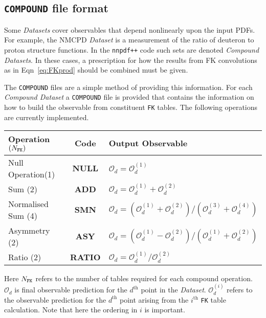 \documentclass[11pt]{article}
\begin{document}
\subsection{{\tt COMPOUND} file format}
Some \emph{Datasets} cover observables that depend nonlinearly upon the input PDFs. For example, the NMCPD \emph{Dataset} is a measurement of the ratio of deuteron to proton structure functions. In the {\tt nnpdf++} code such sets are denoted \emph{Compound Datasets}. In these cases, a prescription for how the results from FK convolutions as in Eqn~\ref{eq:FKprod} should be combined must be given. 

The {\tt COMPOUND} files are a simple method of providing this information. For each \emph{Compound Dataset} a {\tt COMPOUND} file is provided that contains the information on how to build the observable from constituent {\tt FK} tables. The following operations are currently implemented.
\begin{table}[htp]
\begin{center}
\begin{tabular}{|l|c|l|}
\hline
Operation $(N_{\text{\tt FK}})$ & Code & Output Observable\\
\hline\hline
Null Operation(1)& \textbf{NULL} &  $\mathcal{O}_d =  \mathcal{O}_d^{(1)}$ \\
Sum (2)& \textbf{ADD} &  $\mathcal{O}_d = \mathcal{O}^{(1)}_d + \mathcal{O}^{(2)}_d $\\
Normalised Sum (4)&  \textbf{SMN}  & $\mathcal{O}_d = (\mathcal{O}^{(1)}_d + \mathcal{O}^{(2)}_d)/(\mathcal{O}^{(3)}_d + \mathcal{O}^{(4)}_d) $ \\
Asymmetry (2)& \textbf{ASY} &  $\mathcal{O}_d = (\mathcal{O}^{(1)}_d - \mathcal{O}^{(2)}_d)/(\mathcal{O}^{(1)}_d + \mathcal{O}^{(2)}_d) $\\
Ratio (2)&  \textbf{RATIO} & $\mathcal{O}_d = \mathcal{O}^{(1)}_d / \mathcal{O}^{(2)}_d $\\
\hline
\end{tabular}
\end{center}
\label{default}
\end{table}%

Here $N_{\text{\tt FK}}$ refers to the number of tables required for each compound operation. $\mathcal{O}_d$ is final observable prediction for the $d^{\text{th}}$ point in the \emph{Dataset}. $\mathcal{O}_d^{(i)}$ refers to the observable prediction for the $d^{\text{th}}$ point arising from the $i^{\text{th}}$ {\tt FK} table calculation. Note that here the ordering in $i$ is important.
\end{document}
